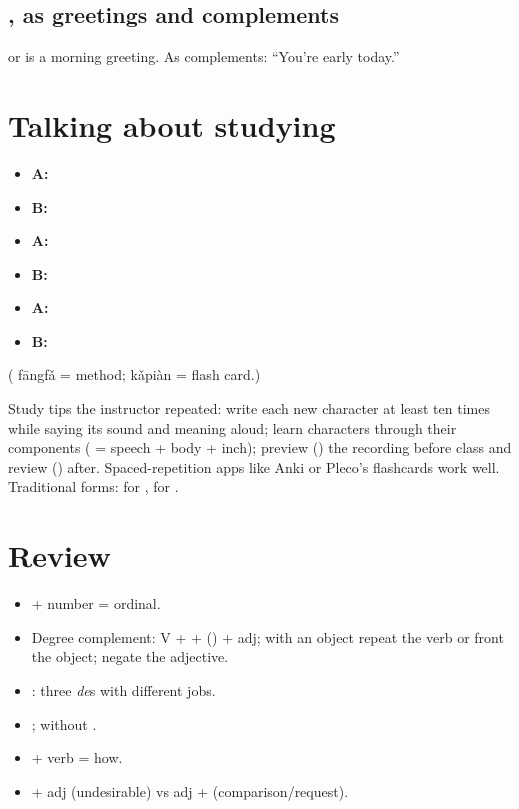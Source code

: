 \subsection{,  as greetings and complements}

 or  is a morning greeting. As complements:
 ``You're early today.''

\section{Talking about studying}

\begin{example}\leavevmode
\begin{itemize}
  \item \textbf{A:} 
  \item \textbf{B:} 
  \item \textbf{A:} 
  \item \textbf{B:} 
  \item \textbf{A:} 
  \item \textbf{B:} 
\end{itemize}
( fāngfǎ = method;  kǎpiàn = flash card.)
\end{example}

\begin{aside}
Study tips the instructor repeated: write each new character at least ten times
while saying its sound and meaning aloud; learn characters through their components
( =  speech +  body +  inch); preview () the
recording before class and review () after. Spaced-repetition apps like Anki or
Pleco's flashcards work well. Traditional forms:  for ,
 for .
\end{aside}

\section*{Review}
\begin{itemize}
  \item {} + number = ordinal.
  \item Degree complement: V +  + () + adj; with an object repeat the verb or
        front the object; negate the adjective.
  \item {}: three \emph{de}s with different jobs.
  \item {};  without .
  \item {} + verb = how.
  \item {} + adj (undesirable) vs adj +  (comparison/request).
\end{itemize}
